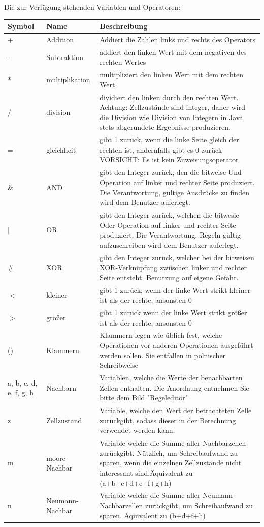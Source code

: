 \documentclass[11pt,a4paper]{article}
\begin{document}
\par
Die zur Verfügung stehenden Variablen und Operatoren:
\par
\begin{longtable}[m]{|m{2cm}|m{2.5cm}|m{6.5cm}|}
\hline
Symbol&Name&Beschreibung\\
\hline
+ & Addition & Addiert die Zahlen links und rechts des Operators\\
\hline
- & Subtraktion & addiert den linken Wert mit dem negativen des rechten Wertes\\
\hline
* & multiplikation & multipliziert den linken Wert mit dem rechten Wert\\
\hline
/ & division & dividiert den linken durch den rechten Wert. Achtung: Zellzustände sind integer, daher wird die Division wie Division von Integern in Java stets abgerundete Ergebnisse produzieren.\\
\hline
= & gleichheit & gibt 1 zurück, wenn die linke Seite gleich der rechten ist, andernfalls gibt es 0 zurück VORSICHT: Es ist kein Zuweisungsoperator\\ 
\hline

\&  & AND & gibt den Integer zurück, den die bitweise Und-Operation auf linker und rechter Seite produziert. Die Verantwortung, gültige Ausdrücke zu finden wird dem Benutzer auferlegt.\\
\hline
$|$ & OR & gibt den Integer zurück, welchen die bitwesie Oder-Operation auf linker und rechter Seite produziert. Die Verantwortung, Regeln gültig aufzuschreiben wird dem Benutzer auferlegt.\\

\hline
\#&XOR&gibt den Integer zurück, welcher bei der bitweisen XOR-Verknüpfung zwiischen linker und rechter Seite entsteht. Benutzung auf eigene Gefahr.\\
\hline
$<$ & kleiner & gibt 1 zurück, wenn der linke Wert strikt kleiner ist als der rechte, ansonsten 0\\
\hline
$>$&größer & gibt 1 zurück wenn der linke Wert strikt größer ist als der rechte, ansonsten 0\\
\hline
()&Klammern&Klammern legen wie üblich fest, welche Operationen vor anderen Operationen ausgeführt werden sollen. Sie entfallen in polnischer Schreibweise\\
\hline
a, b, c, d, e, f, g, h&Nachbarn&Variablen, welche die Werte der benachbarten Zellen enthalten. Die Anordnung entnehmen Sie bitte dem Bild "Regeleditor"\\
\hline 
z&Zellzustand& Variable, welche den Wert der betrachteten Zelle zurückgibt, sodass dieser in der Berechnung verwendet werden kann.\\
\hline
m&moore-Nachbar&Variable welche die Summe aller Nachbarzellen zurückgibt. Nützlich, um Schreibaufwand zu sparen, wenn die einzelnen Zellzustände nicht interessant sind.Äquivalent zu (a+b+c+d+e+f+g+h)\\
\hline
n&Neumann-Nachbar&Variable welche die Summe aller Neumann-Nachbarzellen zurückgibt, um Schreibaufwand zu sparen.  Äquivalent zu (b+d+f+h)\\
\hline
\end{longtable}
\end{document}
